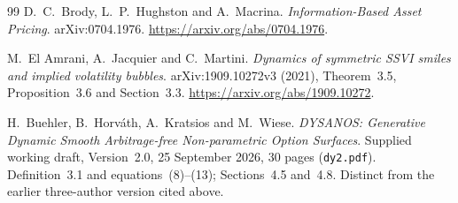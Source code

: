 \documentclass[11pt,a4paper]{article}
\numberwithin{equation}{section}
\theoremstyle{definition}\newtheorem{definition}[theorem]{Definition}
\theoremstyle{remark}\newtheorem{remark}[theorem]{Remark}
\begin{document}
\begin{thebibliography}{99}
D.~C.~Brody, L.~P.~Hughston and A.~Macrina. \emph{Information-Based Asset Pricing}. arXiv:0704.1976. \url{https://arxiv.org/abs/0704.1976}.

M.~El Amrani, A.~Jacquier and C.~Martini. \emph{Dynamics of symmetric SSVI smiles and implied volatility bubbles}. arXiv:1909.10272v3 (2021), Theorem~3.5, Proposition~3.6 and Section~3.3. \url{https://arxiv.org/abs/1909.10272}.


H.~Buehler, B.~Horv\'ath, A.~Kratsios and M.~Wiese.
\emph{DYSANOS: Generative Dynamic Smooth Arbitrage-free Non-parametric Option Surfaces}.
Supplied working draft, Version~2.0, 25 September 2026, 30 pages (\texttt{dy2.pdf}). Definition~3.1 and equations~(8)--(13); Sections~4.5 and~4.8. Distinct from the earlier three-author version cited above.

\end{thebibliography}
\endgroup
\end{document}
